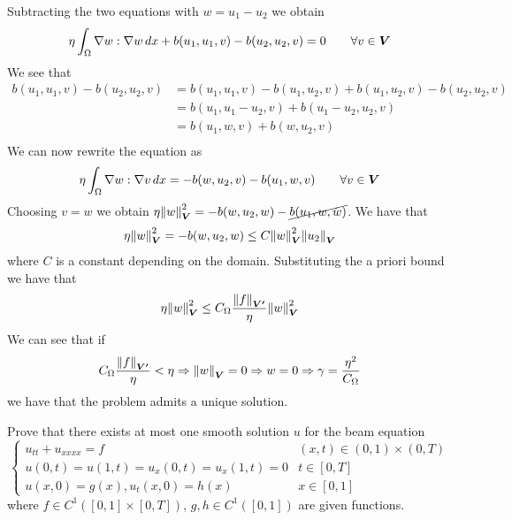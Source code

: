 \begin{enumerate}
    Subtracting the two equations with \(w = u_1 - u_2\) we obtain
    \[
        \begin{split}
            \eta \int_\Omega \nabla w : \nabla w \, dx + b(u_1, u_1, v) - b(u_2, u_2, v) = 0 \qquad \forall v \in \bm{V}
        \end{split}
    \]
    We see that 
    \begin{align*}
        b(u_1, u_1, v) - b(u_2, u_2, v) &= b(u_1, u_1, v) - b(u_1, u_2, v) + b(u_1, u_2, v) - b(u_2, u_2, v) \\
        &= b(u_1, u_1 - u_2, v) + b(u_1 - u_2, u_2, v) \\
        &= b(u_1, w, v) + b(w, u_2, v) \\
    \end{align*}
    We can now rewrite the equation as
    \[
        \begin{split}
            \eta \int_\Omega \nabla w : \nabla v \, dx= -b(w, u_2, v) - b(u_1, w, v) \qquad \forall v \in \bm{V}
        \end{split}
    \]
    Choosing \(v = w\) we obtain \(\eta \norm{w}_{\bm{V}}^2 = -b(w, u_2, w) - \cancel{b(u_1, w, w)}\). We have that
    \[
        \begin{split}
            \eta \norm{w}_{\bm{V}}^2 = -b(w, u_2, w) \leq C \norm{w}_{\bm{V}}^2 \norm{u_2}_{\bm{V}}
        \end{split}
    \]
    where \(C\) is a constant depending on the domain. Substituting the a priori bound we have that
    \[
        \begin{split}
             \eta \norm{w}_{\bm{V}}^2 \leq C_\Omega \frac{\norm{f}_{\bm{V'}}}{\eta} \norm{w}_{\bm{V}}^2
        \end{split}
    \]
    We can see that if
    \[
        \begin{split}
            C_\Omega \frac{\norm{f}_{\bm{V'}}}{\eta} < \eta \Rightarrow \norm{w}_{\bm{V}} = 0 \Rightarrow w = 0 \Rightarrow \gamma = \frac{\eta^2}{C_\Omega} 
        \end{split}
    \]
    we have that the problem admits a unique solution. 
\end{enumerate}

\newpage
\begin{exercise}
    Prove that there exists at most one smooth solution \(u\) for the beam equation
    \[
        \begin{cases}
            u_{tt} + u_{xxxx} = f & (x,t) \in (0,1) \times (0, T) \\
            u(0, t) = u(1, t) = u_x(0, t) = u_x(1, t) = 0 & t \in [0, T] \\
            u(x, 0) = g(x), u_t(x, 0) = h(x) & x \in [0, 1]
        \end{cases}
        \tag*{(P)}
    \]
    where \(f \in C^1([0,1] \times [0, T])\), \(g, h \in C^1([0,1])\) are given functions.
\end{exercise}


